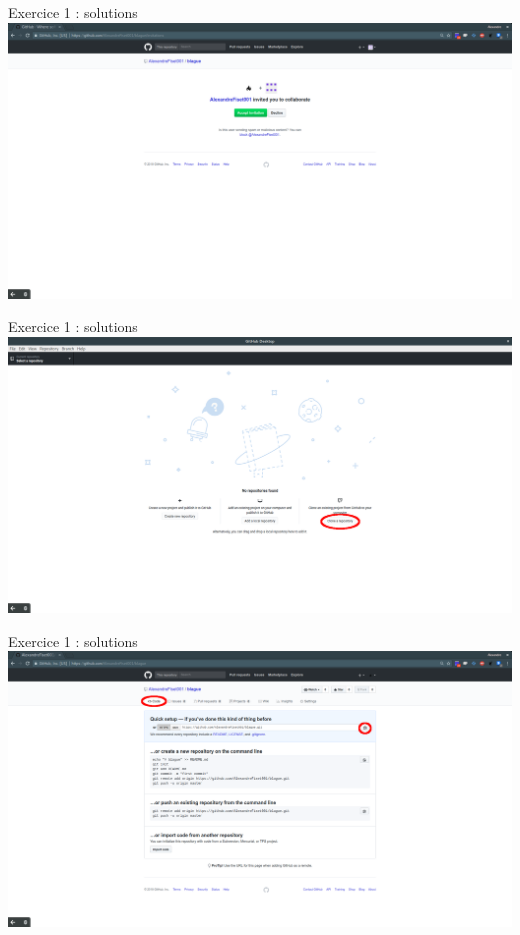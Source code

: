 \documentclass{beamer}
\begin{document}
\begin{frame}{Exercice 1 : solutions}
	\centering
    \includegraphics[scale=0.16]{img/image_exercices/accept_invitation.png}
\end{frame}

\begin{frame}{Exercice 1 : solutions}
	\centering
    \includegraphics[scale=0.16]{img/image_exercices/clonning_repo.png}
\end{frame}

\begin{frame}{Exercice 1 : solutions}
	\centering
    \includegraphics[scale=0.16]{img/image_exercices/getting_url.png}
\end{frame}
\end{document}
